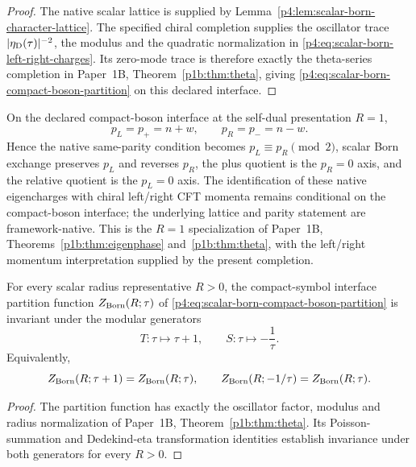 \documentclass[12pt,a4paper]{article}
\begin{document}
\begin{proof}
The native scalar lattice is supplied by
Lemma~\ref{p4:lem:scalar-born-character-lattice}. The specified chiral
completion supplies the oscillator trace $|\eta_{\rm D}(\tau)|^{-2}$,
the modulus and the quadratic normalization in
\eqref{p4:eq:scalar-born-left-right-charges}. Its zero-mode trace is
therefore exactly the theta-series completion in Paper~1B,
Theorem~\ref{p1b:thm:theta}, giving
\eqref{p4:eq:scalar-born-compact-boson-partition} on this declared
interface.
\end{proof}



\begin{corollary}
\label{p4:cor:v190-selfdual-born-eigencharges}
On the declared compact-boson interface at the self-dual presentation $R=1$,
\[
 \boxed{p_L=p_+=n+w,\qquad p_R=p_-=n-w.}
\]
Hence the native same-parity condition becomes $p_L\equiv p_R\pmod2$,
scalar Born exchange preserves $p_L$ and reverses $p_R$, the plus quotient is
the $p_R=0$ axis, and the relative quotient is the $p_L=0$ axis.  The
identification of these native eigencharges with chiral left/right CFT momenta
remains conditional on the compact-boson interface; the underlying lattice
and parity statement are framework-native.
This is the $R=1$ specialization of Paper~1B,
Theorems~\ref{p1b:thm:eigenphase} and~\ref{p1b:thm:theta}, with the
left/right momentum interpretation supplied by the present completion.
\end{corollary}

\begin{corollary}
\label{p4:cor:scalar-born-modular-invariance}
For every scalar radius representative \(R>0\), the compact-symbol interface partition function
\(Z_{\rm Born}(R;\tau)\) of \eqref{p4:eq:scalar-born-compact-boson-partition} is invariant under the modular generators
\[
  T:\tau\longmapsto \tau+1,
  \qquad
  S:\tau\longmapsto -\frac1\tau .
\]
Equivalently,
\[
  Z_{\rm Born}(R;\tau+1)=Z_{\rm Born}(R;\tau),
  \qquad
  Z_{\rm Born}(R;-1/\tau)=Z_{\rm Born}(R;\tau).
\]
\end{corollary}

\begin{proof}
The partition function has exactly the oscillator factor, modulus
and radius normalization of Paper~1B, Theorem~\ref{p1b:thm:theta}.
Its Poisson-summation and Dedekind-eta transformation identities establish
invariance under both generators for every $R>0$.
\end{proof}
\end{document}
